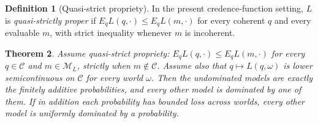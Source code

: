 \documentclass[11pt]{article}
\newtheorem{theorem}{Theorem}[section]
\theoremstyle{definition}
\newtheorem{definition}[theorem]{Definition}
\theoremstyle{remark}
\newcommand{\M}{\mathcal M}
\newcommand{\C}{\mathcal C}
\begin{document}
\begin{definition}[Quasi-strict propriety]\label{def:quasi-propriety}
In the present credence-function setting, $L$ is \emph{quasi-strictly proper} if
$E_qL(q,\cdot)\le E_qL(m,\cdot)$ for every coherent $q$ and every evaluable $m$,
with strict inequality whenever $m$ is incoherent.
\end{definition}

\begin{theorem}\label{thm:nielsen}
Assume \emph{quasi-strict propriety}: $E_qL(q,\cdot)\le E_qL(m,\cdot)$ for every $q\in\C$ and $m\in\M_L$, strictly when $m\notin\C$. Assume also that $q\mapsto L(q,\omega)$ is lower semicontinuous on $\C$ for every world $\omega$. Then the undominated models are exactly the finitely additive probabilities, and every other model is dominated by one of them. If in addition each probability has bounded loss across worlds, every other model is uniformly dominated by a probability.
\end{theorem}
\end{document}
